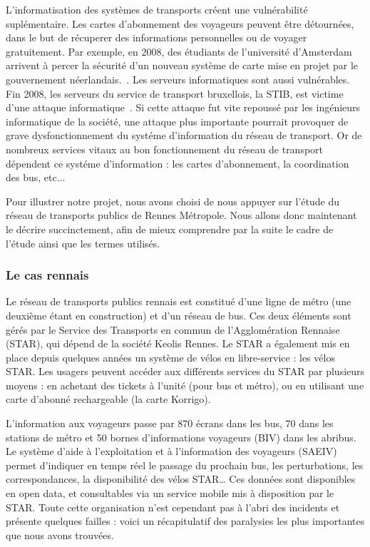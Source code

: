 	L'informatisation des systèmes de transports créent une vulnérabilité suplémentaire. Les cartes d'abonnement des voyageurs peuvent être détournées, dans le but de récuperer des informations personnelles ou de voyager gratuitement. Par exemple, en 2008, des étudiants de l'université d'Amsterdam arrivent à percer la sécurité d'un nouveau système de carte mise en projet par le gouvernement néerlandais.~\cite{Amst_RFID}. Les serveurs informatiques sont aussi vulnérables. Fin 2008, les serveurs du service de transport bruxellois, la STIB, est victime d'une attaque informatique~\cite{STIB}. Si cette attaque fut vite repoussé par les ingénieurs informatique de la société, une attaque plus importante pourrait provoquer de grave dysfonctionnement du systéme d'information du réseau de transport. Or de nombreux services vitaux au bon fonctionnement du réseau de transport dépendent ce systéme d'information : les cartes d'abonnement, la coordination des bus, etc...

	Pour illustrer notre projet, nous avons choisi de nous appuyer sur l'étude du réseau de transports publics de Rennes Métropole. Nous allons donc maintenant le décrire succinctement, afin de mieux comprendre par la suite le cadre de l'étude ainsi que les termes utilisés.
                
\subsubsection{Le cas rennais}
	Le réseau de transports publics rennais est constitué d'une ligne de métro (une deuxième étant en construction) et d'un réseau de bus. Ces deux éléments sont gérés par le Service des Transports en commun de l'Agglomération Rennaise (STAR), qui dépend de la société Keolis Rennes. Le STAR a également mis en place depuis quelques années un système de vélos en libre-service : les vélos STAR. Les usagers peuvent accéder aux différents services du STAR par plusieurs moyens : en achetant des tickets à l'unité (pour bus et métro), ou en utilisant une carte d'abonné rechargeable (la carte Korrigo). 
                
        L'information aux voyageurs passe par 870 écrans dans les bus, 70 dans les stations de métro et 50 bornes d’informations voyageurs (BIV) dans les abribus. Le système d’aide à l’exploitation et à l’information des voyageurs (SAEIV) permet d’indiquer en temps réel le passage du prochain bus, les perturbations, les correspondances, la disponibilité des vélos STAR… Ces données sont disponibles en open data, et consultables via un service mobile mis à disposition par le STAR. Toute cette organisation n'est cependant pas à l'abri des incidents et présente quelques failles : voici un récapitulatif des paralysies les plus importantes que nous avons trouvées. 
        
